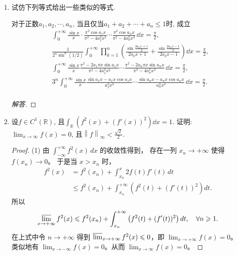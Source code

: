 \begin{quizb}
\begin{enumerate}
\item 试仿下列等式给出一些类似的等式.

对于正数\(a_1,a_2,\cdots,a_n\), 当且仅当\(a_1+a_2+\cdots+a_n\leqslant 1\)时, 成立
\[\begin{split}
&\int_{0}^{+\infty}\frac{\sin x}{x}\cdot\frac{\pi^2\cos a_1x}{\pi^2-4a_1^2x^2}\cdots\frac{\pi^2\cos a_nx}{\pi^2-4a_n^2x^2}\,\dd x=\frac{\pi}{2},\\
&\frac{1}{2^n\sin^n(1/2)}\int_{0}^{+\infty}\prod_{k=1}^{n}\left(\frac{\sin\frac{2a_kx+1}{2}}{2a_kx+1}+\frac{\sin\frac{2a_kx-1}{2}}{2a_kx-1}\right)\dd x=\frac{\pi}{2},\\
&\int_{0}^{+\infty}\frac{\sin x}{x}\frac{\pi^2-2a_1\pi x\sin a_1x}{\pi^2-4a_1^2x^2}\cdots\frac{\pi^2-2a_n\pi x\sin a_nx}{\pi^2-4a_n^2x^2}\,\dd x=\frac{\pi}{2},\\
&3^n\int_{0}^{+\infty}\frac{\sin x}{x}\frac{\sin a_1x-a_1x\cos a_1x}{a_1^3x^3}\cdots\frac{\sin a_nx-a_nx\cos a_nx}{a_n^3x^3}\,\dd x=\frac{\pi}{2}.\\
\end{split}\]
\begin{proof}[解答]
	
\end{proof}
\item 设\(f\in C^1(\mathbb{R})\), 且\(\int_{\mathbb{R}}\left(f^2(x)+(f'(x))^2\right)\dd x=1\). 
证明: \(\lim_{x\rightarrow\infty}f(x)=0\), 且\(\left\|f\right\|_{\infty}<\frac{\sqrt{2}}{2}\).
\begin{proof}
(1) 由 \(\int_{-\infty}^{+\infty} f^2(x)\,dx\) 的收敛性得到，
存在一列 $x_n \rightarrow+\infty$ 使得 $f(x_n) \rightarrow 0$。
于是当 $x>x_n$ 时，
\begin{align*}
    f^2(x)&=f^2(x_n)+\int_{x_n}^x 2 f(t) f'(t)\,dt\\
    &\leqslant f^2(x_n)+\int_{x_n}^{+\infty}\left(f^2(t)+(f'(t))^2\right) dt.
\end{align*}
所以
\[\varlimsup_{x \rightarrow+\infty} f^2(x) \leqslant f^2(x_n)+\int_{x_n}^{+\infty}\left(f^2(t)+(f'(t))^2\right) dt, \quad \forall n \geqslant 1.\]
在上式中令 $n \rightarrow+\infty$ 得到 \(\varlimsup_{x \rightarrow+\infty} f^2(x) \leqslant 0\)，即 \(\lim_{x \rightarrow+\infty} f(x)=0\)。
类似地有 \(\lim_{x \rightarrow-\infty} f(x)=0\)。从而 \(\lim_{x \rightarrow \infty} f(x)=0\)。


\end{proof}
\end{enumerate}
\end{quizb}

